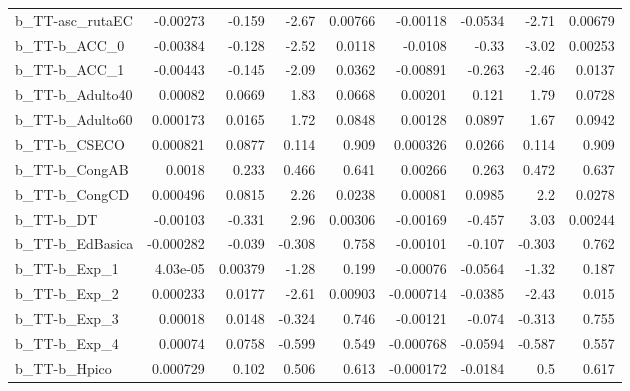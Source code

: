 \begin{tabular}{lrrrrrrrr}
b\_TT-asc\_rutaEC            &    -0.00273 &       -0.159 &     -2.67 &  0.00766 &   -0.00118 &     -0.0534 &        -2.71 &       0.00679 \\
b\_TT-b\_ACC\_0               &    -0.00384 &       -0.128 &     -2.52 &   0.0118 &    -0.0108 &       -0.33 &        -3.02 &       0.00253 \\
b\_TT-b\_ACC\_1               &    -0.00443 &       -0.145 &     -2.09 &   0.0362 &   -0.00891 &      -0.263 &        -2.46 &        0.0137 \\
b\_TT-b\_Adulto40            &     0.00082 &       0.0669 &      1.83 &   0.0668 &    0.00201 &       0.121 &         1.79 &        0.0728 \\
b\_TT-b\_Adulto60            &    0.000173 &       0.0165 &      1.72 &   0.0848 &    0.00128 &      0.0897 &         1.67 &        0.0942 \\
b\_TT-b\_CSECO               &    0.000821 &       0.0877 &     0.114 &    0.909 &   0.000326 &      0.0266 &        0.114 &         0.909 \\
b\_TT-b\_CongAB              &      0.0018 &        0.233 &     0.466 &    0.641 &    0.00266 &       0.263 &        0.472 &         0.637 \\
b\_TT-b\_CongCD              &    0.000496 &       0.0815 &      2.26 &   0.0238 &    0.00081 &      0.0985 &          2.2 &        0.0278 \\
b\_TT-b\_DT                  &    -0.00103 &       -0.331 &      2.96 &  0.00306 &   -0.00169 &      -0.457 &         3.03 &       0.00244 \\
b\_TT-b\_EdBasica            &   -0.000282 &       -0.039 &    -0.308 &    0.758 &   -0.00101 &      -0.107 &       -0.303 &         0.762 \\
b\_TT-b\_Exp\_1               &    4.03e-05 &      0.00379 &     -1.28 &    0.199 &   -0.00076 &     -0.0564 &        -1.32 &         0.187 \\
b\_TT-b\_Exp\_2               &    0.000233 &       0.0177 &     -2.61 &  0.00903 &  -0.000714 &     -0.0385 &        -2.43 &         0.015 \\
b\_TT-b\_Exp\_3               &     0.00018 &       0.0148 &    -0.324 &    0.746 &   -0.00121 &      -0.074 &       -0.313 &         0.755 \\
b\_TT-b\_Exp\_4               &     0.00074 &       0.0758 &    -0.599 &    0.549 &  -0.000768 &     -0.0594 &       -0.587 &         0.557 \\
b\_TT-b\_Hpico               &    0.000729 &        0.102 &     0.506 &    0.613 &  -0.000172 &     -0.0184 &          0.5 &         0.617 \\

\end{tabular}
